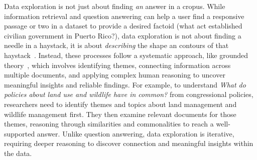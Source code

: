 
Data exploration is not just about finding \emph{an} answer in a
cropus.
%
While information retrieval and question answering can help a user
find a responsive passage or two in a dataset to provide a desired
factoid (what act established civilian government in Puerto Rico?),
data exploration is not about finding a needle in a haystack, it is
about \emph{describing} the shape an contours of that
haystack~\cite{karpukhin2020densepassageretrievalopendomain,
yang2018hotpotqadatasetdiverseexplainable}.
%
Instead, these processes follow a systematic approach, like grounded
theory~\cite{chun_tie_grounded_2019}, which involves identifying
themes, connecting information across multiple documents, and applying
complex human reasoning to uncover meaningful insights and reliable
findings.
%
For example, to understand \textit{What do policies about land use and
wildlife have in common?} from congressional policies,
researchers need to identify themes and topics about land management
and wildlife management first.
%
They then examine relevant documents for those themes, reasoning
through similarities and commonalities to reach a well-supported
answer.
%
Unlike question answering, data exploration is iterative, requiring deeper reasoning to discover connection and meaningful insights within the data.


